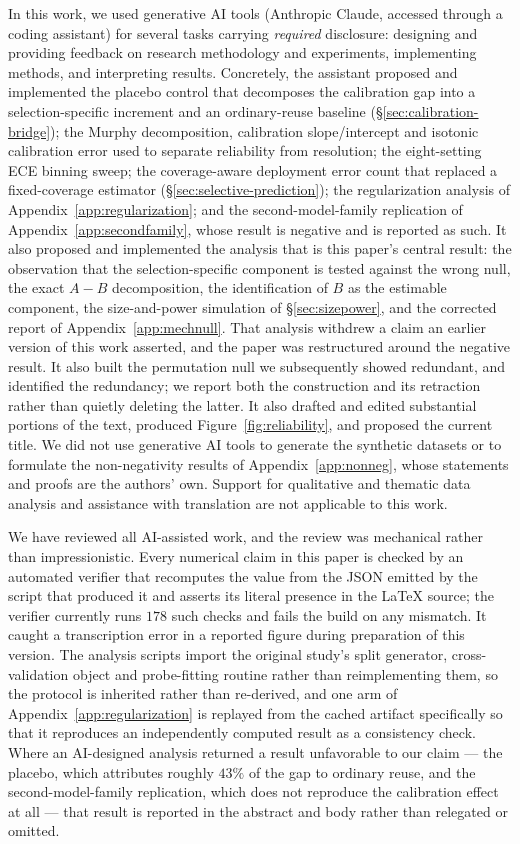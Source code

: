 \documentclass{article}
\begin{document}
In this work, we used generative AI tools (Anthropic Claude, accessed through a
coding assistant) for several tasks carrying \emph{required} disclosure:
designing and providing feedback on research methodology and experiments,
implementing methods, and interpreting results. Concretely, the assistant
proposed and implemented the placebo control that decomposes the calibration
gap into a selection-specific increment and an ordinary-reuse baseline
(\S\ref{sec:calibration-bridge}); the Murphy decomposition, calibration
slope/intercept and isotonic calibration error used to separate reliability from
resolution; the eight-setting ECE binning sweep; the coverage-aware deployment
error count that replaced a fixed-coverage estimator
(\S\ref{sec:selective-prediction}); the regularization analysis of
Appendix~\ref{app:regularization}; and the second-model-family replication of
Appendix~\ref{app:secondfamily}, whose result is negative and is reported as
such. It also proposed and implemented the analysis that is this paper's central
result: the observation that the selection-specific component is tested
against the wrong null, the exact $A-B$ decomposition, the identification of
$B$ as the estimable component, the size-and-power simulation of
\S\ref{sec:sizepower}, and the corrected report of
Appendix~\ref{app:mechnull}. That analysis withdrew a claim an earlier version
of this work asserted, and the paper was restructured around the negative
result. It also built the permutation null we subsequently showed redundant,
and identified the redundancy; we report both the construction and its
retraction rather than quietly deleting the latter. It also drafted and edited substantial portions of the text,
produced Figure~\ref{fig:reliability}, and proposed the current title. We did not use
generative AI tools to generate the synthetic datasets or to formulate the
non-negativity results of Appendix~\ref{app:nonneg}, whose statements and
proofs are the authors' own. Support for qualitative and thematic data analysis
and assistance with translation are not applicable to this work.

We have reviewed all AI-assisted work, and the review was mechanical rather
than impressionistic. Every numerical claim in this paper is checked by an
automated verifier that recomputes the value from the JSON emitted by the
script that produced it and asserts its literal presence in the \LaTeX{}
source; the verifier currently runs $178$ such checks and fails the build on
any mismatch. It caught a transcription error in a reported figure during
preparation of this version. The analysis scripts import the original study's
split generator, cross-validation object and probe-fitting routine rather than
reimplementing them, so the protocol is inherited rather than re-derived, and
one arm of Appendix~\ref{app:regularization} is replayed from the cached
artifact specifically so that it reproduces an independently computed result as
a consistency check. Where an AI-designed analysis returned a result unfavorable
to our claim --- the placebo, which attributes roughly $43\%$ of the gap to
ordinary reuse, and the second-model-family replication, which does not
reproduce the calibration effect at all --- that result is reported in the
abstract and body rather than relegated or omitted.
\end{document}
